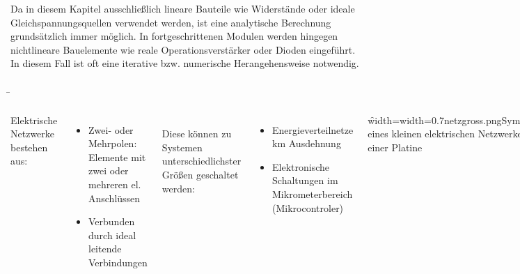 { 
 Da in diesem Kapitel ausschließlich lineare Bauteile wie Widerstände oder ideale Gleichspannungsquellen verwendet werden, ist eine analytische 
 Berechnung grundsätzlich immer möglich. In fortgeschrittenen Modulen werden hingegen nichtlineare Bauelemente
 wie reale Operationsverstärker oder Dioden eingeführt. In diesem Fall ist oft eine iterative bzw. numerische Herangehensweise
 notwendig.



}





\begin{frame}

	\b{

	\begin{columns}

		Elektrische Netzwerke bestehen aus: 
		\begin{itemize}
			\item Zwei- oder Mehrpolen: Elemente mit zwei oder mehreren el. Anschlüssen
			\item Verbunden durch ideal leitende Verbindungen
		\end{itemize}

		\phantom{.}\\

		Diese können zu Systemen unterschiedlichster Größen geschaltet werden:
		
		\begin{itemize}
			\item Energieverteilnetze  km Ausdehnung
			\item Elektronische Schaltungen im Mikrometerbereich (Mikrocontroler)
		\end{itemize}


		
	

		\f{width=\textwidth}{width=0.7\textwidth}{netzgross.png}{Symbolbild eines kleinen elektrischen Netzwerkes auf einer Platine}
		\begin{center}
			Symbolbilder
		\end{center}

		\f{width=\textwidth}{width=0.7\textwidth}{netzklein.png}{Symbolbild eines kleinen elektrischen Netzwerkes auf einer Platine}


\end{columns}}
\end{frame}
